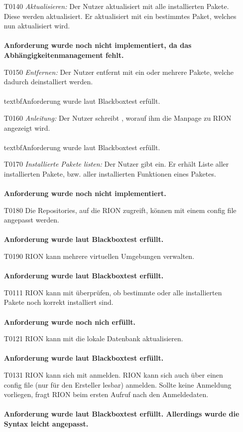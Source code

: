 \begin{itemize}
	\item[T0140] \textit{Aktualisieren:} Der Nutzer aktualisiert mit  alle installierten Pakete. Diese werden aktualisiert. Er aktualisiert mit  ein bestimmtes Paket, welches nun aktualisiert wird.\\\\
	\textbf{Anforderung wurde noch nicht implementiert, da das Abhängigkeitenmanagement fehlt.}
	\item[T0150] \textit{Entfernen:} Der Nutzer entfernt mit  ein oder mehrere Pakete, welche dadurch deinstalliert werden.\\\\
	textbf{Anforderung wurde laut Blackboxtest erfüllt.}
	\item[T0160] \textit{Anleitung:} Der Nutzer schreibt , worauf ihm die Manpage zu RION angezeigt wird.\\\\
		textbf{Anforderung wurde laut Blackboxtest erfüllt.}
	\item[T0170] \textit{Installierte Pakete listen:} Der Nutzer gibt  ein. Er erhält Liste aller installierten Pakete, bzw. aller installierten Funktionen eines Paketes.\\\\
		\textbf{Anforderung wurde noch nicht implementiert.}
	\item[T0180] Die Repositories, auf die RION zugreift, können mit einem config file angepasst werden.\\\\
		\textbf{Anforderung wurde laut Blackboxtest erfüllt.}
	\item[T0190] RION kann mehrere virtuellen Umgebungen verwalten.\\\\
		\textbf{Anforderung wurde laut Blackboxtest erfüllt.}
	\item[T0111] RION kann mit 	 überprüfen, ob bestimmte oder alle installierten Pakete noch korrekt installiert sind.\\\\
		\textbf{Anforderung wurde noch nich erfüllt.}
	\item[T0121] RION kann mit  die lokale Datenbank aktualisieren.\\\\
		\textbf{Anforderung wurde laut Blackboxtest erfüllt.}
	\item[T0131] RION kann sich mit  anmelden. RION kann sich auch über einen config file (nur für den Ersteller lesbar) anmelden. Sollte keine Anmeldung vorliegen, fragt RION beim ersten Aufruf nach den Anmeldedaten.\\\\
	\textbf{Anforderung wurde laut Blackboxtest erfüllt. Allerdings wurde die Syntax leicht angepasst.}
\end{itemize}
